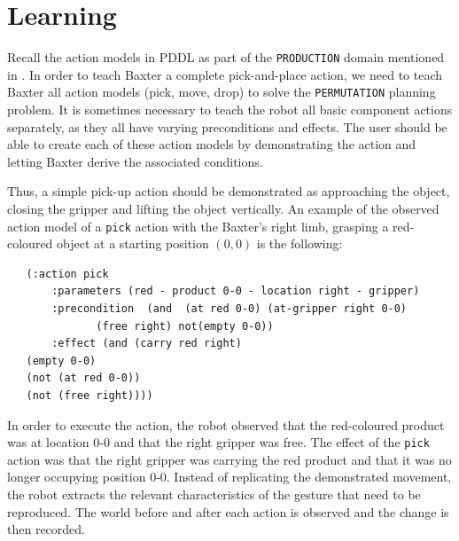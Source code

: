  
\section{Learning}
\label{Create an action model}
Recall the action models in PDDL as part of the \texttt{PRODUCTION} domain mentioned in .
In order to teach Baxter a complete pick-and-place action, we need to teach Baxter all action models (pick, move, drop) to solve the \texttt{PERMUTATION} planning problem.
It is sometimes necessary to teach the robot all basic component actions separately, as they all have varying preconditions and effects.
The user should be able to create each of these action models by demonstrating the action and letting Baxter derive the associated conditions.


Thus, a simple pick-up action should be demonstrated as approaching the object, closing the gripper and lifting the object vertically.
An example of the observed action model of a \texttt{pick} action with the Baxter's right limb, grasping a red-coloured object at a starting position $(0,0)$ is the following:

\begin{verbatim}
   (:action pick
       :parameters (red - product 0-0 - location right - gripper)
       :precondition  (and  (at red 0-0) (at-gripper right 0-0) 
              (free right) not(empty 0-0))
       :effect (and (carry red right)
   (empty 0-0)
   (not (at red 0-0)) 
   (not (free right))))
\end{verbatim}
In order to execute the action, the robot observed that the red-coloured product was at location 0-0 and that the right gripper was free.
The effect of the \texttt{pick} action was that the right gripper was carrying the red product and that it was no longer occupying position 0-0.
Instead of replicating the demonstrated movement, the robot extracts the relevant characteristics of the gesture that need to be reproduced.
The world before and after each action is observed and the change is then recorded.


